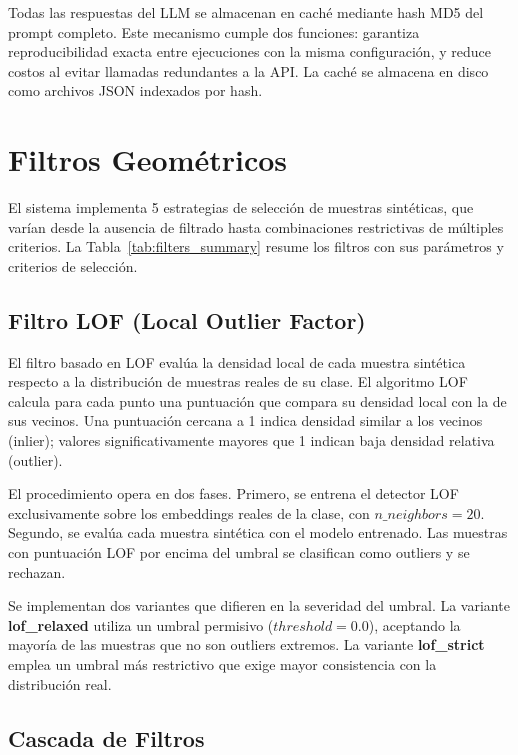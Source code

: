 Todas las respuestas del LLM se almacenan en caché mediante hash MD5 del prompt completo. Este mecanismo cumple dos funciones: garantiza reproducibilidad exacta entre ejecuciones con la misma configuración, y reduce costos al evitar llamadas redundantes a la API. La caché se almacena en disco como archivos JSON indexados por hash.

\section{Filtros Geométricos}
\label{sec:filtros_geometricos}

El sistema implementa 5 estrategias de selección de muestras sintéticas, que varían desde la ausencia de filtrado hasta combinaciones restrictivas de múltiples criterios. La Tabla~\ref{tab:filters_summary} resume los filtros con sus parámetros y criterios de selección.



\subsection{Filtro LOF (Local Outlier Factor)}
\label{subsec:filtro_lof}

El filtro basado en LOF evalúa la densidad local de cada muestra sintética respecto a la distribución de muestras reales de su clase. El algoritmo LOF calcula para cada punto una puntuación que compara su densidad local con la de sus vecinos. Una puntuación cercana a 1 indica densidad similar a los vecinos (inlier); valores significativamente mayores que 1 indican baja densidad relativa (outlier).

El procedimiento opera en dos fases. Primero, se entrena el detector LOF exclusivamente sobre los embeddings reales de la clase, con $n\_neighbors=20$. Segundo, se evalúa cada muestra sintética con el modelo entrenado. Las muestras con puntuación LOF por encima del umbral se clasifican como outliers y se rechazan.

Se implementan dos variantes que difieren en la severidad del umbral. La variante \textbf{lof\_relaxed} utiliza un umbral permisivo ($threshold=0.0$), aceptando la mayoría de las muestras que no son outliers extremos. La variante \textbf{lof\_strict} emplea un umbral más restrictivo que exige mayor consistencia con la distribución real.

\subsection{Cascada de Filtros}
\label{subsec:cascada_filtros}

